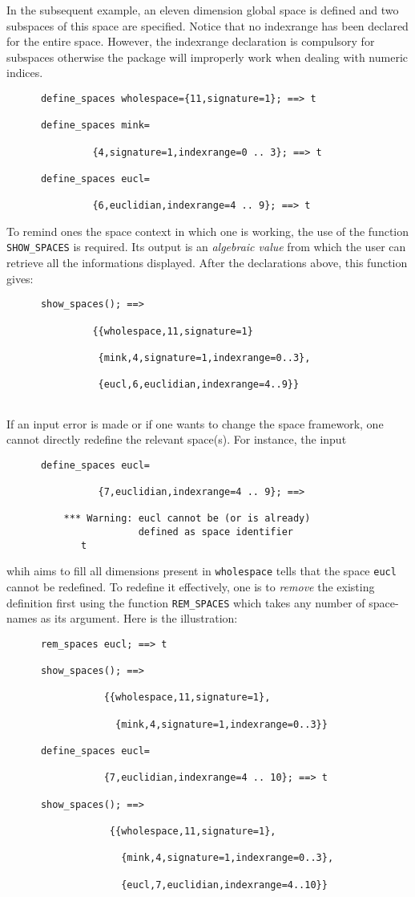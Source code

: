 In the subsequent example, an eleven dimension global space is defined 
and two subspaces of this space are specified.
Notice that no indexrange has been declared for the entire space. 
However, the indexrange declaration is compulsory for subspaces otherwise
the package will improperly work when dealing with numeric indices.
\begin{verbatim}
      define_spaces wholespace={11,signature=1}; ==> t

      define_spaces mink=

               {4,signature=1,indexrange=0 .. 3}; ==> t
  
      define_spaces eucl=

               {6,euclidian,indexrange=4 .. 9}; ==> t      
\end{verbatim}
To remind ones the space context in which one is working, the use of the 
function \texttt{SHOW\_SPACES} is required. Its output is an 
\emph{algebraic value} from which the user can retrieve all the informations
displayed. After the declarations above, this function gives:
\begin{verbatim}
      show_spaces(); ==> 

               {{wholespace,11,signature=1}

                {mink,4,signature=1,indexrange=0..3},

                {eucl,6,euclidian,indexrange=4..9}}
  
\end{verbatim}
If an input error is made  or if one wants to change the space framework, one 
cannot directly redefine the relevant space(s). For instance, the input
\begin{verbatim}
      define_spaces eucl=

                {7,euclidian,indexrange=4 .. 9}; ==> 

          *** Warning: eucl cannot be (or is already)
                       defined as space identifier
             t  
\end{verbatim}
whih aims to fill all dimensions present in \texttt{wholespace}
tells that the space \texttt{eucl} cannot be redefined. To redefine it effectively, 
one is  to \emph{remove} the existing definition first using the function 
\texttt{REM\_SPACES} which takes any number of space-names as 
its argument. Here is the illustration:
\begin{verbatim}
      rem_spaces eucl; ==> t

      show_spaces(); ==>

                 {{wholespace,11,signature=1},

                   {mink,4,signature=1,indexrange=0..3}}

      define_spaces eucl=

                 {7,euclidian,indexrange=4 .. 10}; ==> t

      show_spaces(); ==> 

                  {{wholespace,11,signature=1},

                    {mink,4,signature=1,indexrange=0..3},

                    {eucl,7,euclidian,indexrange=4..10}}
\end{verbatim} 
